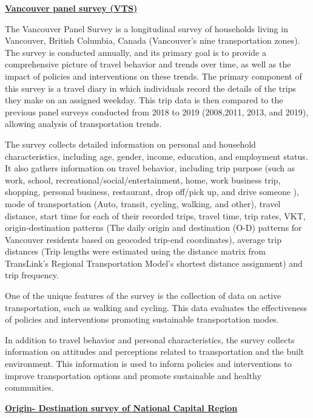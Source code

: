 \documentclass[
11pt, %
oneside, %
english, %
singlespacing, %
]{macthesis} %
\begin{document}
\textbf{\href{https://vancouver.ca/streets-transportation/annual-transportation-survey.aspx}{Vancouver panel survey (VTS)}}

The Vancouver Panel Survey is a longitudinal survey of households living in Vancouver, British Columbia, Canada (Vancouver's nine transportation zones). The survey is conducted annually, and its primary goal is to provide a comprehensive picture of travel behavior and trends over time, as well as the impact of policies and interventions on these trends. The primary component of this survey is a travel diary in which individuals record the details of the trips they make on an assigned weekday. This trip data is then compared to the previous panel surveys conducted from 2018 to 2019 (2008,2011, 2013, and 2019), allowing analysis of transportation trends.

The survey collects detailed information on personal and household characteristics, including age, gender, income, education, and employment status. It also gathers information on travel behavior, including trip purpose (such as work, school, recreational/social/entertainment, home, work business trip, shopping, personal business, restaurant, drop off/pick up, and drive someone ), mode of transportation (Auto, transit, cycling, walking, and other), travel distance, start time for each of their recorded trips, travel time, trip rates, VKT, origin-destination patterns (The daily origin and destination (O-D) patterns for Vancouver residents based on geocoded trip-end coordinates), average trip distances (Trip lengths were estimated using the distance matrix from TransLink's Regional Transportation Model's shortest distance assignment) and trip frequency.

One of the unique features of the survey is the collection of data on active transportation, such as walking and cycling. This data evaluates the effectiveness of policies and interventions promoting sustainable transportation modes.

In addition to travel behavior and personal characteristics, the survey collects information on attitudes and perceptions related to transportation and the built environment. This information is used to inform policies and interventions to improve transportation options and promote sustainable and healthy communities.

\textbf{\href{http://www.ncr-trans-rcn.ca/surveys/o-d-survey}{Origin- Destination survey of National Capital Region}}
\end{document}
